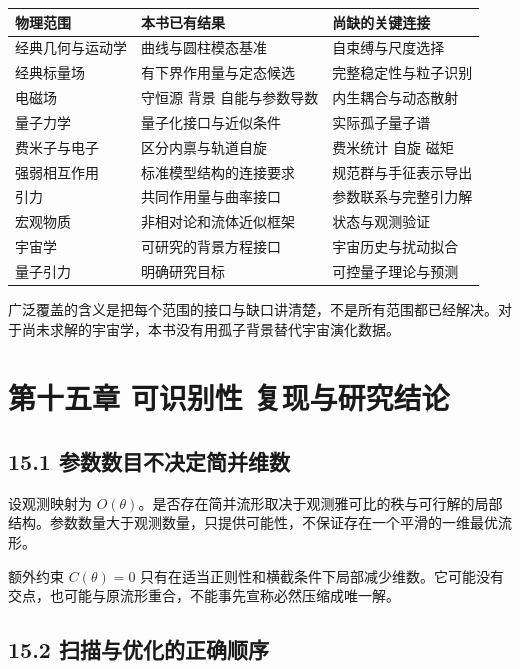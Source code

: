 \documentclass[UTF8,fontset=fandol,11pt]{ctexart}
\begin{document}
\begin{center}\small
\begin{tabularx}{\textwidth}{>{\raggedright\arraybackslash}X>{\raggedright\arraybackslash}X>{\raggedright\arraybackslash}X}
\toprule
物理范围 & 本书已有结果 & 尚缺的关键连接 \\
\midrule
经典几何与运动学 & 曲线与圆柱模态基准 & 自束缚与尺度选择 \\
经典标量场 & 有下界作用量与定态候选 & 完整稳定性与粒子识别 \\
电磁场 & 守恒源 背景 自能与参数导数 & 内生耦合与动态散射 \\
量子力学 & 量子化接口与近似条件 & 实际孤子量子谱 \\
费米子与电子 & 区分内禀与轨道自旋 & 费米统计 自旋 磁矩 \\
强弱相互作用 & 标准模型结构的连接要求 & 规范群与手征表示导出 \\
引力 & 共同作用量与曲率接口 & 参数联系与完整引力解 \\
宏观物质 & 非相对论和流体近似框架 & 状态与观测验证 \\
宇宙学 & 可研究的背景方程接口 & 宇宙历史与扰动拟合 \\
量子引力 & 明确研究目标 & 可控量子理论与预测 \\
\bottomrule
\end{tabularx}
\end{center}

广泛覆盖的含义是把每个范围的接口与缺口讲清楚，不是所有范围都已经解决。对于尚未求解的宇宙学，本书没有用孤子背景替代宇宙演化数据。

\section*{第十五章 可识别性 复现与研究结论}

\subsection*{15.1 参数数目不决定简并维数}

设观测映射为 \(O(\theta)\)。是否存在简并流形取决于观测雅可比的秩与可行解的局部结构。参数数量大于观测数量，只提供可能性，不保证存在一个平滑的一维最优流形。

额外约束 \(C(\theta)=0\) 只有在适当正则性和横截条件下局部减少维数。它可能没有交点，也可能与原流形重合，不能事先宣称必然压缩成唯一解。

\subsection*{15.2 扫描与优化的正确顺序}
\end{document}
